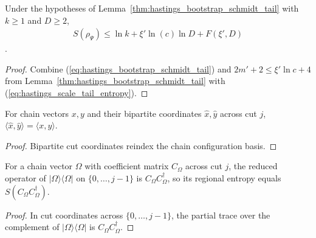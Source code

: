 \begin{lemma}
    \label{thm:hastings_bootstrap_stage}
    \leanok
    Under the hypotheses of Lemma~\ref{thm:hastings_bootstrap_schmidt_tail}
    with $k\ge1$ and $D\ge2$,
    \begin{align}
        S(\rho_\Psi)\le\ln k+\xi'\ln(c)\ln D+F(\xi',D)
        \label{eq:hastings_bootstrap_stage}
    \end{align}
    \cite[Lemma~2, eq.~(bootstrap)]{Hastings2007AreaLaw}.
\end{lemma}
\begin{proof}\leanok
    Combine (\ref{eq:hastings_bootstrap_schmidt_tail}) and
    $2m'+2\le\xi'\ln c+4$ from Lemma~\ref{thm:hastings_bootstrap_schmidt_tail}
    with (\ref{eq:hastings_scale_tail_entropy}).
\end{proof}

\begin{lemma}
    \label{thm:hastings_cut_coordinates}
    \leanok
    For chain vectors $x,y$ and their bipartite coordinates $\hat x,\hat y$
    across cut $j$, $\langle\hat x,\hat y\rangle=\langle x,y\rangle$.
\end{lemma}
\begin{proof}\leanok
    Bipartite cut coordinates reindex the chain configuration basis.
\end{proof}

\begin{lemma}
    \label{thm:hastings_cut_entropy}
    \leanok
    For a chain vector $\Omega$ with coefficient matrix $C_\Omega$ across cut
    $j$, the reduced operator of $|\Omega\rangle\langle\Omega|$ on
    $\{0,\dots,j-1\}$ is $C_\Omega C_\Omega^\dagger$, so its regional entropy
    equals $S(C_\Omega C_\Omega^\dagger)$.
\end{lemma}
\begin{proof}\leanok
    In cut coordinates across $\{0,\dots,j-1\}$, the partial trace over the
    complement of $|\Omega\rangle\langle\Omega|$ is $C_\Omega C_\Omega^\dagger$.
\end{proof}

